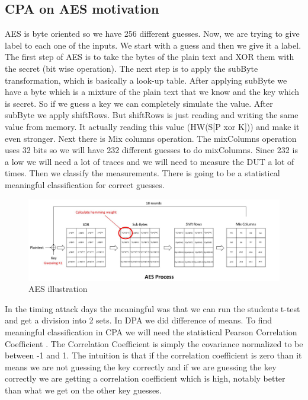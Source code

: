 \subsection{CPA on AES motivation}

AES is byte oriented so we have 256 different guesses. Now, we are trying to give label to each one of the inputs. We start with a guess and then we give it a label. The first step of AES is to take the bytes of the plain text and XOR them with the secret (bit wise operation). The next step is to apply the subByte transformation, which is basically a look-up table. After applying subByte we have a byte which is a mixture of the plain text that we know and the key which is secret. So if we guess a key we can completely simulate the value. After subByte we apply shiftRows. But shiftRows is just reading and writing the same value from memory. It actually reading this value (HW(S[P xor K])) and make it even stronger. Next there is Mix columns operation. The mixColumns operation uses 32 bits so we will have 232 different guesses to do mixColumns. Since 232 is a low we will need a lot of traces and we will need to measure the DUT a lot of times. Then we classify the measurements. There is going to be a statistical meaningful classification for correct guesses.

\begin{figure}[!ht]
    \centering
    \includegraphics[width=1.0\textwidth]{images/chapter8/aes_process.jpg}
    \caption{AES illustration} \label{c8_aes:fig}
\end{figure}

In the timing attack days the meaningful was that we can run the students t-test and get a division into 2 sets. In DPA we did  difference of means. To find meaningful classification in CPA we will need the statistical Pearson Correlation Coefficient \cite{PearsonCorrelationCoefficient}. The Correlation Coefficient is simply the covariance normalized to be between -1 and 1. The intuition is that if the correlation coefficient is zero than it means we are not guessing the key correctly and if we are guessing the key correctly we are getting a correlation coefficient which is high, notably better than what we get on the other key guesses. 

